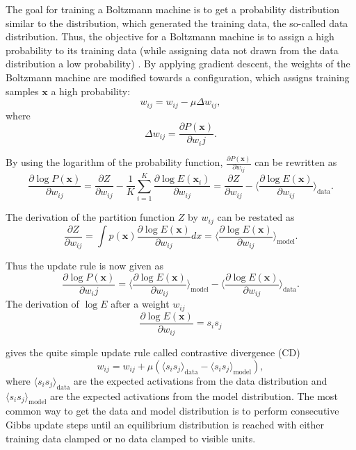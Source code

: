 The goal for training a Boltzmann machine is to get a probability distribution similar to the distribution, which generated the training data, the so-called data distribution.
Thus, the objective for a Boltzmann machine is to assign a high probability to its training data (while assigning data not drawn from the data distribution a low probability) \cite{ackley1985learning}\cite{Bengio2009}\cite{hinton2002training}\cite{Woodford2002} .
By applying gradient descent, the weights of the Boltzmann machine are modified towards a configuration, which assigns training samples $\textbf{x}$ a high probability:
\[
w_{ij} = w_{ij} - \mu \Delta w_{ij},
\]
where
\[
\Delta w_{ij} = \frac{\partial P(\textbf{x})}{\partial w_ij}.
\]

By using the logarithm of the probability function, $\frac{\partial P(\textbf{x})}{\partial w_{ij}}$ can be rewritten as
\[
\frac{\partial \log P(\textbf{x})}{\partial w_{ij}} = \frac{\partial Z}{\partial w_{ij}} - \frac{1}{K} \sum_{i=1}^K \frac{\partial \log E(\textbf{x}_i)}{\partial w_{ij}} =  \frac{\partial Z}{\partial w_{ij}} - \Big \langle \frac{\partial \log E(\textbf{x})}{\partial w_{ij}} \Big \rangle_{\text{data}}.
\]    

The derivation of the partition function $Z$ by $w_{ij}$ can be restated as
\[
 \frac{\partial Z}{\partial w_{ij}} = \int p(\textbf{x}) \frac{\partial \log E(\textbf{x})}{\partial w_{ij}} dx = \Big \langle \frac{\partial \log E(\textbf{x})}{\partial w_{ij}} \Big \rangle_{\text{model}}.
\]

Thus the update rule is now given as
\[
\frac{\partial \log P(\textbf{x})}{\partial w_ij} =  \Big \langle \frac{\partial \log E(\textbf{x})}{\partial w_{ij}} \Big \rangle_{\text{model}} - \Big \langle \frac{\partial \log E(\textbf{x})}{\partial w_{ij}} \Big \rangle_{\text{data}}.
\]
The derivation of $\log E$ after a weight $w_{ij}$
\[
\frac{\partial \log E(\textbf{x})}{\partial w_{ij}} = s_i s_j
\]

gives the quite simple update rule called contrastive divergence (CD)
\[
w_{ij}= w_{ij} + \mu ( \langle s_i s_j \rangle_{\text{data}} - \langle s_i s_j \rangle_{\text{model}} ) ,
\]
where $\langle s_i s_j \rangle_{\text{data}}$ are the expected activations from the data distribution and  $ \langle s_i s_j \rangle_{\text{model}}$ are the expected activations from the model distribution.
The most common way to get the data and model distribution is to perform consecutive Gibbs update steps until an equilibrium distribution is reached with either training data clamped or no data clamped to visible units.

